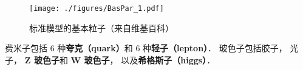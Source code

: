 
\begin{figure}[ht]
\centering
\texttt{[image: ./figures/BasPar\_1.pdf]}
\caption{标准模型的基本粒子（来自维基百科）} \label{BasPar_fig1}
\end{figure}

费米子包括 6 种\textbf{夸克（quark）}和 6 种\textbf{轻子（lepton）}． 玻色子包括胶子， 光子， \textbf{Z 玻色子}和 \textbf{W 玻色子}， 以及\textbf{希格斯子（higgs）}．
